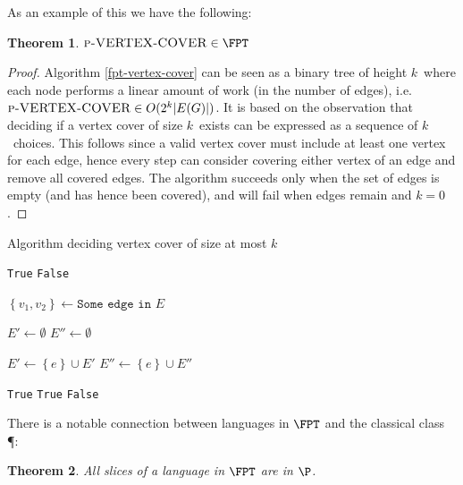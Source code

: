 \documentclass[a4paper,11pt]{report}
\theoremstyle{plain}
\newtheorem{thm}{Theorem}[chapter] %
\theoremstyle{definition}
\begin{document}
As an example of this we have the following:
\begin{thm}
$\textsc{p-VERTEX-COVER} \in \FPT$
\end{thm}

\begin{proof}
Algorithm \ref{fpt-vertex-cover} can be seen as a binary tree of height $k$ where each node performs a linear amount of work (in the number of edges), i.e. $\textsc{p-VERTEX-COVER} \in O(2^k |E(G)|)$.
It is based on the observation that deciding if a vertex cover of size $k$ exists can be expressed as a sequence of $k$ choices.
This follows since a valid vertex cover must include at least one vertex for each edge, hence every step can consider covering either vertex of an edge and remove all covered edges.
The algorithm succeeds only when the set of edges is empty (and has hence been covered), and will fail when edges remain and $k = 0$.
\end{proof}

\begin{algorithm}
\begin{algorithmic}
\caption{Algorithm deciding vertex cover of size at most $k$}
\label{fpt-vertex-cover}
    \Return \texttt{True}
    \Return \texttt{False}
\EndIf

\State $\left\{v_1, v_2\right\} \gets \texttt{Some edge in } E$

\State $E'\gets \emptyset$
\State $E''\gets \emptyset$

      \State $E'\gets \left\{e\right\}\cup E'$
  \EndIf
      \State $E''\gets \left\{e\right\}\cup E''$
  \EndIf
\EndFor

    \Return \texttt{True}
    \Return \texttt{True}
\Else {}
    \Return \texttt{False}
\EndIf

\EndProcedure
\end{algorithmic}
\end{algorithm}

There is a notable connection between languages in $\FPT$ and the classical class \P:

\begin{thm}
All slices of a language in $\FPT$ are in $\P$.
\end{thm}
\end{document}
